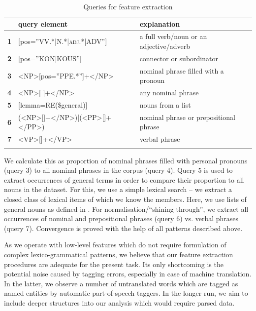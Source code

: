 \documentclass[output=paper]{LSP/langsci}
\begin{document}
\begin{table}
     \centering
     \begin{tabular}{lll}
\lsptoprule
              & \textbf{query element}         & \textbf{explanation} \\ \midrule
\textbf{1}    & [pos=”VV.*|N.*|\textsc{adj}.*|ADV”]     & a full verb/noun or an adjective/adverb \\
\textbf{2}    & [pos=”KON|KOUS”]               & connector or subordinator \\
\textbf{3}    & <NP>[pos=”PPE.*”]+</NP>		   & nominal phrase filled with a pronoun \\
\textbf{4}    & <NP>[ ]+</NP>             & any nominal phrase \\ 
\textbf{5}    & [lemma=RE(\$general)]     & nouns from a list   \\ 
\textbf{6}    & (<NP>[]+</NP>)|(<PP>[]+</PP>) & nominal phrase or prepositional phrase \\
\textbf{7}    & <VP>[]+</VP> & verbal phrase\\
\lspbottomrule
     \end{tabular}

 \caption{Queries for feature extraction}
     \label{tab:4.1}
\end{table}

We calculate this as proportion of nominal phrases filled with personal pronouns (query 3) to all nominal phrases in the corpus (query 4). Query 5 is used to extract occurrences of general terms in order to compare their proportion to all nouns in the dataset. For this, we use a simple lexical search – we extract a closed class of lexical items of which we know the members. Here, we use lists of general nouns as defined in \citep{Dipper2012}. For normalisation/“shining through”, we extract all occurrences of nominal and prepositional phrases (query 6) vs. verbal phrases (query 7). Convergence is proved with the help of all patterns described above.

As we operate with low-level features which do not require formulation of complex lexico-grammatical patterns, we believe that our feature extraction procedures are adequate for the present task.  Its only shortcoming is the potential noise caused by tagging errors, especially in case of machine translation. In the latter, we observe a number of untranslated words which are tagged as named entities by automatic part-of-speech taggers.  In the longer run, we aim to include deeper structures into our analysis which would require parsed data.
\end{document}

